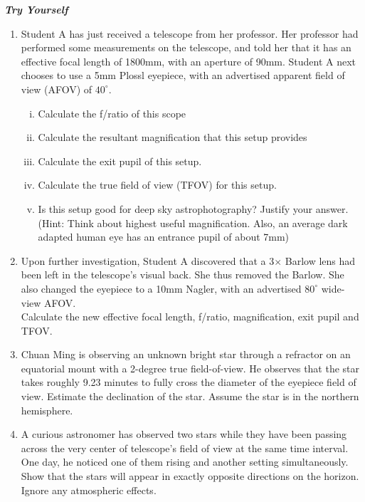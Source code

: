 \documentclass[a4paper,12pt]{extarticle}
\begin{document}
\clearpage
\textbf{\textit{Try Yourself}}
\begin{enumerate}[T1.]	
\item  Student A has just received a telescope from her professor. Her professor had performed some measurements on the telescope, and told her that it has an effective focal length of 1800mm, with an aperture of 90mm. Student A next chooses to use a 5mm Plossl eyepiece, with an advertised apparent field of view (AFOV) of $40^\circ$.
\begin{enumerate}[i.]
	\item Calculate the f/ratio of this scope
	\item Calculate the resultant magnification that this setup provides
	\item Calculate the exit pupil of this setup.
	\item Calculate the true field of view (TFOV) for this setup.
	\item Is this setup good for deep sky astrophotography? Justify your answer.\\
	(Hint: Think about highest useful magnification. Also, an average dark adapted human eye has an entrance pupil of about 7mm)
\end{enumerate}

\item  Upon further investigation, Student A discovered that a 3$\times$ Barlow lens had been left in the telescope’s visual back. She thus removed the Barlow. She also changed the eyepiece to a 10mm Nagler, with an advertised $80^\circ$ wide-view AFOV.\\

Calculate the new effective focal length, f/ratio, magnification, exit pupil and TFOV.

\item Chuan Ming is observing an unknown bright star through a refractor on an equatorial mount with a
2-degree true field-of-view. He observes that the star takes roughly 9.23 minutes to fully cross the
diameter of the eyepiece field of view. Estimate the declination of the star. Assume the star is in the
northern hemisphere.

\item A curious astronomer has observed two stars while they have been passing across the very center of telescope’s field of view at the same time interval. One day, he noticed one of them rising and another setting simultaneously. Show that the stars will appear in exactly opposite directions on the horizon. Ignore any atmospheric effects.


\end{enumerate}
\end{document}
